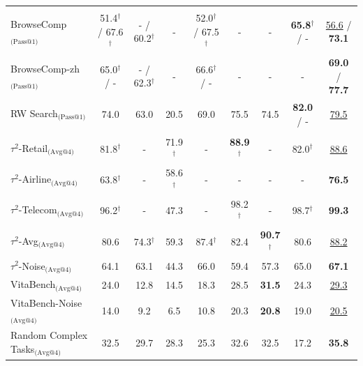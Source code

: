 \begin{table}[t]
{\begin{tabular}{@{}l| c c c c c c c c@{}}
\midrule
\rowcolor{mygray}
\multicolumn{9}{c}{\textit{Agentic Search}} \\
BrowseComp$_\text{(Pass@1)}$
& 51.4$^\dagger$ / 67.6$^\dagger$ & - / 60.2$^\dagger$ & -  & 52.0$^\dagger$ / 67.5$^\dagger$ 
& -  & -  & \textbf{65.8}$^\dagger$ / - & \underline{56.6} / \textbf{73.1} \\
BrowseComp-zh$_\text{(Pass@1)}$ 
& 65.0$^\dagger$ / - & - / 62.3$^\dagger$ & -  & 66.6$^\dagger$ / -
& -  & -  & -  & \textbf{69.0} / \textbf{77.7} \\
RW Search$_\text{(Pass@1)}$      
& 74.0 & 63.0 & 20.5 & 69.0
& 75.5 & 74.5 & \textbf{82.0} / - & \underline{79.5} \\

\midrule
\rowcolor{mygray}
\multicolumn{9}{c}{\textit{Agentic Tool Using}} \\
$\tau^2$-Retail$_\text{(Avg@4)}$ & 81.8$^\dagger$ & - & 71.9$^\dagger$ & - & \textbf{88.9}$^\dagger$ & - & 82.0$^\dagger$ & \underline{88.6} \\
$\tau^2$-Airline$_\text{(Avg@4)}$ & 63.8$^\dagger$ & - & 58.6$^\dagger$ & - & - & - & - & \textbf{76.5} \\
$\tau^2$-Telecom$_\text{(Avg@4)}$ & 96.2$^\dagger$ & - & 47.3 & - & 98.2$^\dagger$ & - & 98.7$^\dagger$ & \textbf{99.3} \\
$\tau^2$-Avg$_\text{(Avg@4)}$ & 80.6 & 74.3$^\dagger$ & 59.3 & 87.4$^\dagger$ & 82.4 & \textbf{90.7}$^\dagger$ & 80.6 & \underline{88.2} \\
$\tau^2$-Noise$_\text{(Avg@4)}$ & 64.1 & 63.1 & 44.3 & 66.0 & 59.4 & 57.3 & 65.0 & \textbf{67.1} \\
VitaBench$_\text{(Avg@4)}$ & 24.0 & 12.8 & 14.5 & 18.3 & 28.5 & \textbf{31.5} & 24.3 & \underline{29.3} \\
VitaBench-Noise$_\text{(Avg@4)}$ & 14.0 & 9.2 & 6.5 & 10.8 & 20.3 & \textbf{20.8} & 19.0 & \underline{20.5} \\
Random Complex Tasks$_\text{(Avg@4)}$ & 32.5 & 29.7 & 28.3 & 25.3 & 32.6 & 32.5 & 17.2 & \textbf{35.8} \\


\end{tabular}}
\end{table}
